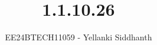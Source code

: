 \documentclass[journal]{IEEEtran}
\begin{document}
	
	
	\vspace{3cm}
	
	\title{1.1.10.26}
	\author{EE24BTECH11059 - Yellanki Siddhanth
	}
	{\let\newpage\relax\maketitle}
	
	\renewcommand{\thefigure}{\theenumi}
	\renewcommand{\thetable}{\theenumi}
	\setlength{\intextsep}{10pt} %
	
	
	\renewcommand{\thetable}{\theenumi}
	
\end{document}
